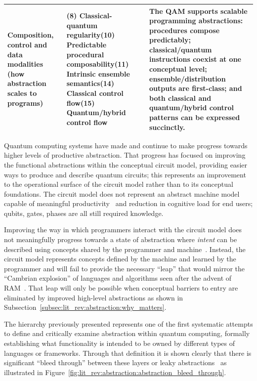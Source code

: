 \begin{table}
\begin{tabularx}{\textwidth}{p{}p{}X}
        \textbf{Composition, control and data modalities (how abstraction scales to programs)}
        & (8) Classical-quantum regularity\newline(10) Predictable procedural composability\newline(11) Intrinsic ensemble semantics\newline(14) Classical control flow\newline(15) Quantum/hybrid control flow
        & The QAM supports scalable programming abstractions: procedures compose predictably; classical/quantum instructions coexist at one conceptual level; ensemble/distribution outputs are first-class; and both classical and quantum/hybrid control patterns can be expressed succinctly. \\

        \bottomrule
    \end{tabularx}
\end{table}

Quantum computing systems have made and continue to make progress towards higher levels of productive abstraction.
That progress has focused on improving the functional abstractions within the conceptual circuit model, providing easier ways to produce and describe quantum circuits; this represents an improvement to the operational surface of the circuit model rather than to its conceptual foundations.
The circuit model does not represent an abstract machine model capable of meaningful productivity~\cite{nunez_corrales2025betterabstractmachines} and reduction in cognitive load for end users; qubits, gates, phases are all still required knowledge.

Improving the way in which programmers interact with the circuit model does not meaningfully progress towards a state of abstraction where \textit{intent} can be described using concepts shared by the programmer and machine~\cite{DiMatteo2024AbstractionHierarchy}.
Instead, the circuit model represents concepts defined by the machine and learned by the programmer and will fail to provide the necessary ``leap'' that would mirror the ``Cambrian explosion'' of languages and algorithms seen after the advent of RAM~\cite{nunez_corrales2025betterabstractmachines}.
That leap will only be possible when conceptual barriers to entry are eliminated by improved high-level abstractions as shown in Subsection~\ref{subsec:lit_rev:abstraction:why_matters}.

The hierarchy previously presented represents one of the first systematic attempts to define and critically examine abstraction within quantum computing, formally establishing what functionality is intended to be owned by different types of languages or frameworks.
Through that definition it is shown clearly that there is significant ``bleed through'' between these layers or leaky abstractions~\cite{DiMatteo2024AbstractionHierarchy} as illustrated in Figure~\ref{fig:lit_rev:abstraction:abstraction_bleed_through}.

